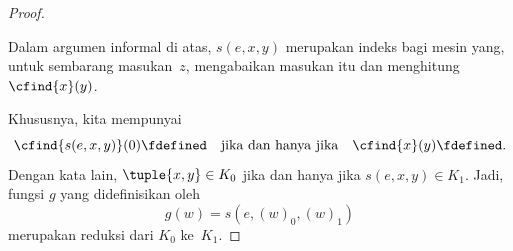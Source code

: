 \documentclass[../../../include/open-logic-section]{subfiles}
\begin{document}
\begin{proof}
\begin{explain}
Dalam argumen informal di atas, $s(e,x,y)$ merupakan indeks bagi mesin yang,
untuk sembarang masukan~$z$, mengabaikan masukan itu dan menghitung
$\cfind{x}(y)$.
\end{explain}

Khususnya, kita mempunyai
\[
\cfind{s(e,x,y)}(0) \fdefined \quad \text{jika dan hanya jika} \quad
\cfind{x}(y) \fdefined.
\]
Dengan kata lain, $\tuple{x,y} \in K_0$ jika dan hanya jika $s(e,x,y) \in
K_1$. Jadi, fungsi $g$ yang didefinisikan oleh
\[
g(w) = s(e,(w)_0,(w)_1)
\]
merupakan reduksi dari $K_0$ ke~$K_1$.
\end{proof}
\end{document}
